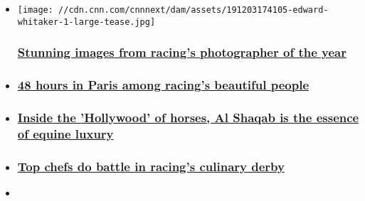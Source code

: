 \begin{itemize}
\item
  \href{/2019/12/05/sport/whitaker-horse-photography-winning-post-spt-intl/index.html}{}

  \texttt{[image: //cdn.cnn.com/cnnnext/dam/assets/191203174105-edward-whitaker-1-large-tease.jpg]}

  \hypertarget{stunning-images-from-racings-photographer-of-the-year}{%
  \subsubsection{\texorpdfstring{\href{/2019/12/05/sport/whitaker-horse-photography-winning-post-spt-intl/index.html}{Stunning
  images from racing's photographer of the
  year}}{Stunning images from racing's photographer of the year}}\label{stunning-images-from-racings-photographer-of-the-year}}
\item
  \hypertarget{48-hours-in-paris-among-racings-beautiful-people}{%
  \subsubsection{\texorpdfstring{\href{/2019/10/15/sport/prix-de-larc-de-triomphe-longchamp-paris-2019-spt-intl/index.html}{48
  hours in Paris among racing's beautiful
  people}}{48 hours in Paris among racing's beautiful people}}\label{48-hours-in-paris-among-racings-beautiful-people}}
\item
  \hypertarget{inside-the-hollywood-of-horses-al-shaqab-is-the-essence-of-equine-luxury}{%
  \subsubsection{\texorpdfstring{\href{/2019/11/11/sport/al-shaqab-hollywood-horses/index.html}{Inside
  the 'Hollywood' of horses, Al Shaqab is the essence of equine
  luxury}}{Inside the 'Hollywood' of horses, Al Shaqab is the essence of equine luxury}}\label{inside-the-hollywood-of-horses-al-shaqab-is-the-essence-of-equine-luxury}}
\item
  \hypertarget{top-chefs-do-battle-in-racings-culinary-derby}{%
  \subsubsection{\texorpdfstring{\href{/travel/article/culinary-horse-race-winning-post-spt-intl/index.html}{Top
  chefs do battle in racing's culinary
  derby}}{Top chefs do battle in racing's culinary derby}}\label{top-chefs-do-battle-in-racings-culinary-derby}}
\item
  \hypertarget{the-remarkable-story-of-the-record-breaker-who-survived-a-wildfire}{%
}
\end{itemize}
